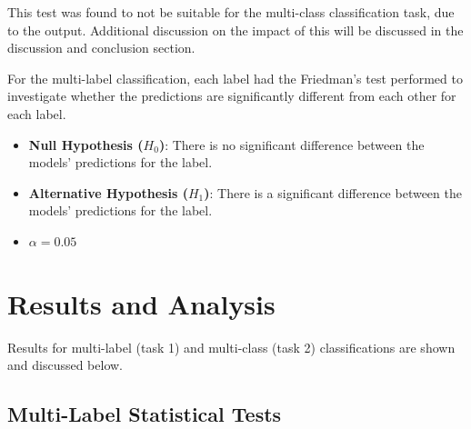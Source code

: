 \documentclass[10.7pt, onecolumn]{article}
\begin{document}
This test was found to not be suitable for the multi-class classification task, due to the output. Additional discussion on the impact of this will be discussed in the discussion and conclusion section.

For the multi-label classification, each label had the Friedman's test performed to investigate whether the predictions are significantly different from each other for each label.

\begin{itemize}
  \item \textbf{Null Hypothesis (\(H_0\))}: There is no significant difference between the models' predictions for the label.

  \item \textbf{Alternative Hypothesis (\(H_1\))}: There is a significant difference between the models' predictions for the label.

  \item \( \alpha = 0.05 \)
\end{itemize}



\newpage
\section{Results and Analysis}\label{results}
Results for multi-label (task 1) and multi-class (task 2) classifications are shown and discussed below.

\subsection{Multi-Label Statistical Tests}
\end{document}
